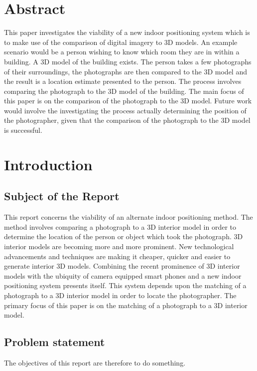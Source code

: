 \documentclass[11pt,a4paper]{report}
\begin{document}
\chapter*{Abstract}
	This paper investigates the viability of a new indoor positioning system which is to make use of the comparison of digital imagery to 3D models. An example scenario would be a person wishing to know which room they are in within a building. A 3D model of the building exists. The person takes a few photographs of their surroundings, the photographs are then compared to the 3D model and the result is a location estimate presented to the person. The process involves comparing the photograph to the 3D model of the building. The main focus of this paper is on the comparison of the photograph to the 3D model. Future work would involve the investigating the process actually determining the position of the photographer, given that the comparison of the photograph to the 3D model is successful.

\newpage
\tableofcontents

\newpage
\listoffigures

\newpage
{}
\setcounter{page}{1}
\chapter{Introduction}
	\section{Subject of the Report}
		This report concerns the viability of an alternate indoor positioning method. The method involves comparing a photograph to a 3D interior model in order to determine the location of the person or object which took the photograph. 3D interior models are becoming more and more prominent. New technological advancements and techniques are making it cheaper, quicker and easier to generate interior 3D models. Combining the recent prominence of 3D interior models with the ubiquity of camera equipped smart phones and a new indoor positioning system presents itself. This system depends upon the matching of a photograph to a 3D interior model in order to locate the photographer. The primary focus of this paper is on the matching of a photograph to a 3D interior model.
	
	\section{Problem statement}
		The objectives of this report are therefore to do something.
		
\end{document}
